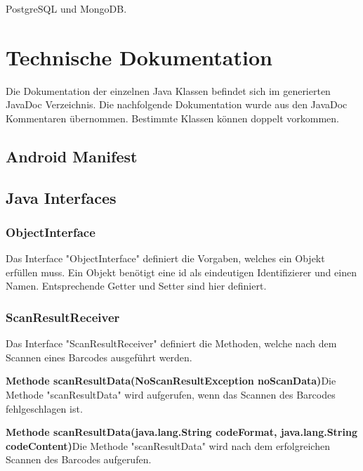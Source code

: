 \documentclass{scrartcl}
\begin{document}
\noindent PostgreSQL und MongoDB.

\newpage

\section{Technische Dokumentation}

Die Dokumentation der einzelnen Java Klassen befindet sich im generierten JavaDoc Verzeichnis. Die nachfolgende Dokumentation wurde aus den JavaDoc Kommentaren übernommen. Bestimmte Klassen können doppelt vorkommen.

\subsection{Android Manifest}

\subsection{Java Interfaces}

\subsubsection{ObjectInterface}

Das Interface "ObjectInterface" definiert die Vorgaben, welches ein Objekt erfüllen muss. Ein Objekt benötigt eine id als eindeutigen Identifizierer und einen Namen. Entsprechende Getter und Setter sind hier definiert.

\subsubsection{ScanResultReceiver}

Das Interface "ScanResultReceiver" definiert die Methoden, welche nach dem Scannen eines Barcodes ausgeführt werden. \newline

\noindent\textbf{Methode scanResultData(NoScanResultException noScanData)}\newline Die Methode "scanResultData" wird aufgerufen, wenn das Scannen des Barcodes fehlgeschlagen ist.\newline

\noindent\textbf{Methode scanResultData(java.lang.String codeFormat, java.lang.String codeContent)}\newline Die Methode "scanResultData" wird nach dem erfolgreichen Scannen des Barcodes aufgerufen.
\end{document}
